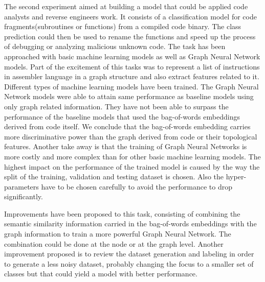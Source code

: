 

The second experiment aimed at building a model that could be applied code analysts and reverse engineers work. It consists of a  classification model for code fragments(subroutines or functions) from a compiled code binary. The class prediction could then be used to rename the functions and speed up the process of debugging or analyzing malicious unknown code. The task has been approached with basic machine learning models as well as Graph Neural Network models. Part of the excitement of this tasks was to represent a list of instructions in assembler language in a graph structure and also extract features related to it. 
Different types of machine learning models have been trained. The Graph Neural Network models were able to attain same performance as baseline models using only graph related information. They have not been able to surpass the performance of the baseline models that used the bag-of-words embeddings derived from code itself.
We conclude that the bag-of-words embedding carries more discriminative power than the graph derived from code or their topological features. Another take away is that the training of Graph Neural Networks is more costly and more complex than for other basic machine learning models. The highest impact on the performance of the trained model is caused by the way the split of the training, validation and testing dataset is chosen. Also the hyper-parameters have to be chosen carefully to avoid the performance to drop significantly.


Improvements have been proposed to this task, consisting of combining the semantic similarity information carried in the bag-of-words embeddings with the graph information to train a more powerful Graph Neural Network. The combination could be done at the node or at the graph level. Another improvement proposed is to review the dataset generation and labeling in order to generate a less noisy dataset, probably changing the focus to a smaller set of classes but that could yield a model with better performance.






